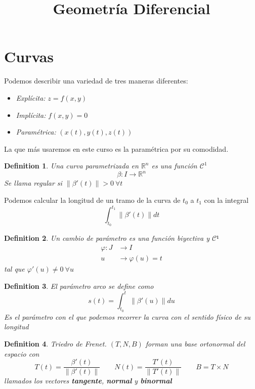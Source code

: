 \documentclass{myclass}
\title{Geometría Diferencial}
\newtheorem*{definition}{Definition}
\begin{document}
\maketitle
\tableofcontents
\newpage

\section{Curvas}
Podemos describir una variedad de tres maneras diferentes:
\begin{itemize}
  \item \textit{Explícita:} $z = f(x, y)$
  \item \textit{Implícita:} $f(x, y)=0$
  \item \textit{Paramétrica:} $(x(t), y(t), z(t))$
\end{itemize}
La que más usaremos en este curso es la paramétrica por su comodidad.

\begin{definition}
Una curva parametrizada en $\mathbb{R}^n$ es una función $\mathcal{C}^1$ 
\[
\beta : I \to \mathbb{R}^n
\] 
Se llama regular si $\|\beta'(t)\|>0 \ \forall t$
\end{definition}

Podemos calcular la longitud de un tramo de la curva de $t_0$ a $t_1$ con la integral
\[
\int_{t_0}^{t_1}\|\beta'(t)\|dt
\] 

\begin{definition}
Un cambio de parámetro es una función biyectiva y $\mathcal{C}¹$
\begin{align*}
  \varphi : J & \to I \\
  u & \to \varphi (u) = t
\end{align*}
tal que $\varphi '(u)\neq 0 \ \forall u$

\end{definition}

\begin{definition}
El parámetro arco se define como
\[
s(t) = \int_{t_0}^{t}\|\beta '(u)\|du
\]
Es el parámetro con el que podemos recorrer la curva con el sentido físico de su longitud
\end{definition}

\begin{definition}
Triedro de Frenet. $(T, N, B)$ forman una base ortonormal del espacio con
 \[
   T(t) = \frac{\beta'(t)}{\|\beta'(t)\|} \qquad N(t) =
\frac{T'(t)}{\|T'(t)\|} \qquad
B = T\times N
\] 
llamados los vectores \textbf{tangente}, \textbf{normal} y \textbf{binormal}
\end{definition}
\end{document}
